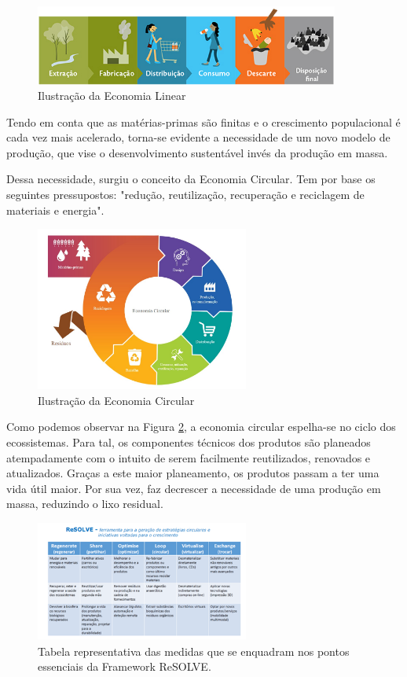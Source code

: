 \begin{figure}[ht]
    \centering
    \includegraphics[width=10cm]{images/EconomiaLinear.png}
    \caption{Ilustração da Economia Linear}
    \label{fig:economia_linear}
\end{figure}

Tendo em conta que as matérias-primas são finitas e o crescimento populacional é cada vez mais acelerado, torna-se evidente a necessidade de um novo modelo de produção, que vise o desenvolvimento sustentável invés da produção em massa.

Dessa necessidade, surgiu o conceito da Economia Circular. Tem por base os seguintes pressupostos: "redução, reutilização, recuperação e reciclagem de materiais e energia"\cite{EconomiaCircular}.

\begin{figure}[ht]
    \centering
    \includegraphics[width=7cm]{images/Economia_Circular.jpeg}
    \caption{Ilustração da Economia Circular}
    \label{fig:economia_circular}
\end{figure}

Como podemos observar na Figura \ref{fig:economia_circular}, a economia circular espelha-se no ciclo dos ecossistemas. Para tal, os componentes técnicos dos produtos são planeados atempadamente com o intuito de serem facilmente reutilizados, renovados e atualizados\cite{EconomiaCircular1}. Graças a este maior planeamento, os produtos passam a ter uma vida útil maior. Por sua vez, faz decrescer a necessidade de uma produção em massa, reduzindo o lixo residual.

\begin{figure}
\includegraphics[width=7cm]{images/Resolve.png}
\caption{Tabela representativa das medidas que se enquadram nos pontos essenciais da Framework ReSOLVE.}\label{wrap-fig:1}
\end{figure}

